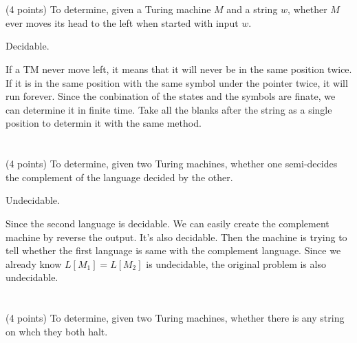 \documentclass[paper=a4, fontsize=11pt]{scrartcl} %
\begin{document}
\section{}
\begin{fancyquotes}
  (4 points) To determine, given a Turing machine $M$ and a string
  $w$, whether $M$ ever moves its head to the left when started with
  input $w$.
\end{fancyquotes}

Decidable.

If a TM never move left, it means that it will never be in the same
position twice. If it is in the same position with the same symbol
under the pointer twice, it will run forever. Since the conbination of
the states and the symbols are finate, we can determine it in finite
time. Take all the blanks after the string as a single position to
determin it with the same method.


\section{}
\begin{fancyquotes}
  (4 points) To determine, given two Turing machines, whether one
  semi-decides the complement of the language decided by the other.
\end{fancyquotes}

Undecidable.

Since the second language is decidable. We can easily create the
complement machine by reverse the output. It's also decidable.
Then the machine is trying to tell whether the first language is same
with the complement language. Since we already know $L[M_1]=L[M_2]$ is
undecidable, the original problem is also undecidable.


\section{}
\begin{fancyquotes}
  (4 points) To determine, given two Turing machines, whether there
  is any string on whch they both halt.
\end{fancyquotes}
\end{document}
